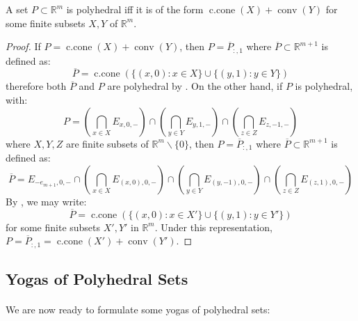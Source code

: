 \begin{prop}\label{prop:017-Minkowski-Weyl-Representation}
	A set $P\subset \mathbb{R}^m$ is polyhedral iff it is of the form $\operatorname{c.cone}(X)+\operatorname{conv}(Y)$ for some finite subsets $X,Y$ of $\mathbb{R}^m$.
\end{prop}
\begin{proof}
	If $P=\operatorname{c.cone}(X)+\operatorname{conv}(Y)$, then $P=\overline{P}_{:,1}$ where $\overline{P}\subset \mathbb{R}^{m+1}$ is defined as:
	\[
		\overline{P}=\operatorname{c.cone}\left(\{(x,0):x\in X\}\cup\{(y,1):y\in Y\}\right)
	\]
	therefore both $\overline{P}$ and $P$ are polyhedral by . On the other hand, if $P$ is polyhedral, with:
	\[
		P=\left(\bigcap_{x\in X} E_{x,0,-}\right)\cap\left(\bigcap_{y\in Y} E_{y,1,-}\right)\cap \left(\bigcap_{z\in Z} E_{z,-1,-}\right)
	\]
	where $X,Y,Z$ are finite subsets of $\mathbb{R}^m\smallsetminus\{0\}$, then $P=\overline{P}_{:,1}$ where $\overline{P}\subset \mathbb{R}^{m+1}$ is defined as:
	\[
		\overline{P}=E_{-e_{m+1},0,-}\cap\left(\bigcap_{x\in X} E_{(x,0),0,-}\right)\cap\left(\bigcap_{y\in Y} E_{(y,-1),0,-}\right)\cap \left(\bigcap_{z\in Z} E_{(z,1),0,-}\right)
	\]
	By , we may write:
	\[
		\overline{P}=\operatorname{c.cone}\left(\{(x,0):x\in X'\}\cup \{(y, 1):y\in Y'\}\right)
	\]
	for some finite subsets $X',Y'$ in $\mathbb{R}^m$. Under this representation, $P=\overline{P}_{:,1}=\operatorname{c.cone}(X')+\operatorname{conv}(Y')$.
\end{proof}

\subsection{Yogas of Polyhedral Sets}

\paragraph{}We are now ready to formulate some yogas of polyhedral sets:

